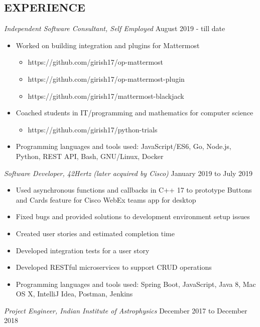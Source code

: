 \documentclass[line, margin]{res}
\begin{document}
\begin{resume}
  \section{EXPERIENCE}
  \textit{Independent Software Consultant, Self Employed} \hfill
  August 2019 - till date \\
  \begin{itemize}
  \item Worked on building integration and plugins for Mattermost
    \begin{itemize}
    \item https://github.com/girish17/op-mattermost
    \item https://github.com/girish17/op-mattermost-plugin
    \item https://github.com/girish17/mattermost-blackjack
    \end{itemize}
  \item Coached students in IT/programming and mathematics for
    computer science
    \begin{itemize}
    \item https://github.com/girish17/python-trials
    \end{itemize}
  \item Programming languages and tools used: JavaScript/ES6, Go, Node.js, Python, REST API,
    Bash, GNU/Linux, Docker
  \end{itemize}
  \textit{Software Developer, 42Hertz (later acquired by Cisco)} \hfill January 2019 to July 2019 \\
  \begin{itemize}
  \item Used asynchronous functions and callbacks in C++ 17 to
    prototype Buttons and Cards feature for Cisco
    WebEx teams app for desktop
  \item Fixed bugs and provided solutions to development environment setup issues
  \item Created user stories and estimated completion time
  \item Developed integration tests for a user story
  \item Developed RESTful microservices to support CRUD operations
  \item Programming languages and tools used: Spring Boot, JavaScript, Java 8, Mac OS X,
    IntelliJ Idea, Postman, Jenkins
  \end{itemize}
  \textit{Project Engineer, Indian Institute of Astrophysics} \hfill
  December 2017 to December 2018 \\

\end{resume}
\end{document}
